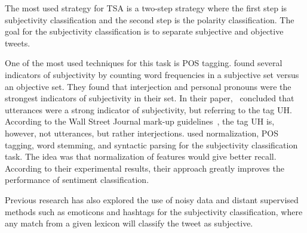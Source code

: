 The most used strategy for TSA is a two-step strategy where the first step is subjectivity classification and the second step is the polarity classification. The goal for the subjectivity classification is to separate subjective and objective tweets.

One of the most used techniques for this task is POS tagging. \cite{article:pak} found several indicators of subjectivity by counting word frequencies in a subjective set versus an objective set. They found that interjection and personal pronouns were the strongest indicators of subjectivity in their set. In their paper,~\cite{article:pak} concluded that utterances were a strong indicator of subjectivity, but referring to the tag UH. According to the Wall Street Journal mark-up guidelines~\citep{treebank}, the tag UH is, however, not utterances, but rather interjections. \cite{article:jiang} used normalization, POS tagging, word stemming, and syntactic parsing for the subjectivity classification task. The idea was that normalization of features would give better recall. According to their experimental results, their approach greatly improves the performance of sentiment classification.

Previous research has also explored the use of noisy data and distant supervised methods such as emoticons and hashtags for the subjectivity classification, where any match from a given lexicon will classify the tweet as subjective.
